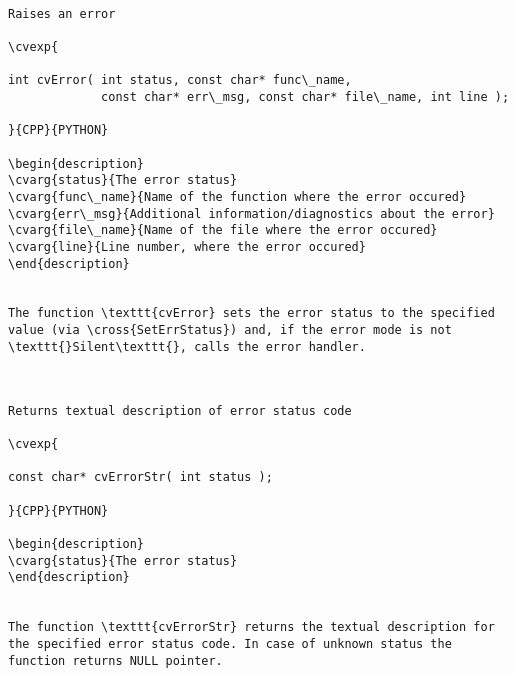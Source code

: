 \begin{verbatim}

Raises an error

\cvexp{

int cvError( int status, const char* func\_name,
             const char* err\_msg, const char* file\_name, int line );

}{CPP}{PYTHON}

\begin{description}
\cvarg{status}{The error status}
\cvarg{func\_name}{Name of the function where the error occured}
\cvarg{err\_msg}{Additional information/diagnostics about the error}
\cvarg{file\_name}{Name of the file where the error occured}
\cvarg{line}{Line number, where the error occured}
\end{description}


The function \texttt{cvError} sets the error status to the specified value (via \cross{SetErrStatus}) and, if the error mode is not \texttt{}Silent\texttt{}, calls the error handler.


\end{verbatim}
\begin{verbatim}

Returns textual description of error status code

\cvexp{

const char* cvErrorStr( int status );

}{CPP}{PYTHON}

\begin{description}
\cvarg{status}{The error status}
\end{description}


The function \texttt{cvErrorStr} returns the textual description for the specified error status code. In case of unknown status the function returns NULL pointer.


\end{verbatim}
